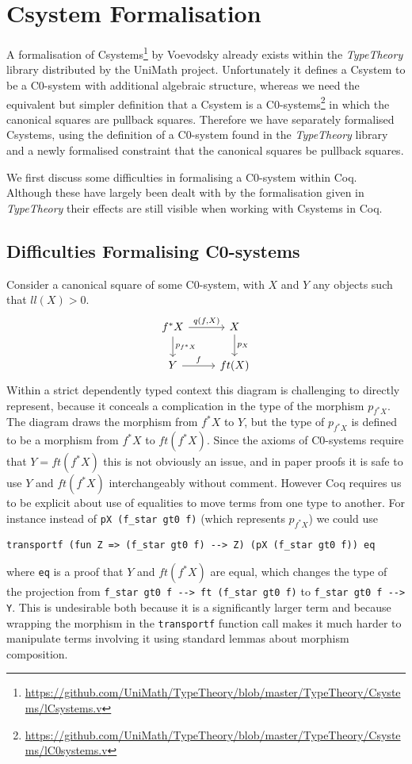 \chapter{Csystem Formalisation}
A formalisation of
Csystems\footnote{\url{https://github.com/UniMath/TypeTheory/blob/master/TypeTheory/Csystems/lCsystems.v}}
by Voevodsky already exists within the \textit{TypeTheory} library distributed
by the UniMath project. Unfortunately it defines a Csystem to be a C0-system
with additional algebraic structure, whereas we need the equivalent but simpler
definition that a Csystem is a
C0-systems\footnote{\url{https://github.com/UniMath/TypeTheory/blob/master/TypeTheory/Csystems/lC0systems.v}}
in which the canonical squares are pullback squares. Therefore we have
separately formalised Csystems, using the definition of a C0-system found in the
\textit{TypeTheory} library and a newly formalised constraint that the canonical
squares be pullback squares.

We first discuss some difficulties in formalising a C0-system within Coq.
Although these have largely been dealt with by the formalisation given in
\textit{TypeTheory} their effects are still visible when working with Csystems
in Coq.

\section{Difficulties Formalising C0-systems}
Consider a canonical square of some C0-system, with $X$ and $Y$ any objects such
that $ll(X) > 0$.
\[
\begin{tikzcd}
    f^*X\ar[r,"{q(f,X)}"]\ar[d,"p_{f^*X}"]&X\ar[d,"p_X"] \\
    Y\ar[r,"f"]&ft(X)
\end{tikzcd}
\]
Within a strict dependently typed context this diagram is challenging to
directly represent, because it conceals a complication in the type of the
morphism $p_{f^*X}$. The diagram draws the morphism from $f^*X$ to $Y$, but the
type of $p_{f^*X}$ is defined to be a morphism from $f^*X$ to $ft(f^*X)$. Since
the axioms of C0-systems require that $Y=ft(f^*X)$ this is not obviously an
issue, and in paper proofs it is safe to use $Y$ and $ft(f^*X)$ interchangeably
without comment. However Coq requires us to be explicit about use of equalities
to move terms from one type to another. For instance instead of 
\lstinline|pX (f_star gt0 f)| (which represents $p_{f^*X}$) we could use
\begin{lstlisting}
transportf (fun Z => (f_star gt0 f) --> Z) (pX (f_star gt0 f)) eq
\end{lstlisting}
where \lstinline|eq| is a proof that $Y$ and $ft(f^*X)$ are equal, which changes
the type of the projection from \lstinline|f_star gt0 f --> ft (f_star gt0 f)|
to \lstinline|f_star gt0 f --> Y|. This is undesirable both because it is a
significantly larger term and because wrapping the morphism in the
\lstinline|transportf| function call makes it much harder to manipulate terms
involving it using standard lemmas about morphism composition.

